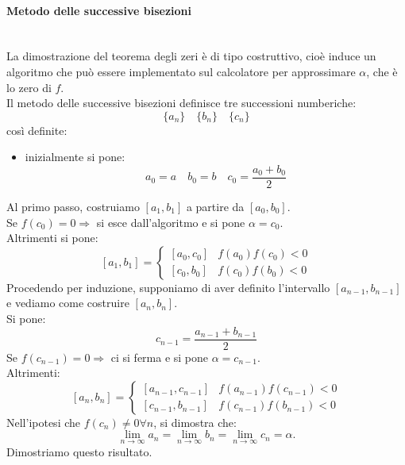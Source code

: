 \documentclass[12pt]{report}
\begin{document}
\paragraph{Metodo delle successive bisezioni} \quad \\
	La dimostrazione del teorema degli zeri è di tipo costruttivo, cioè induce un algoritmo che può essere implementato sul calcolatore per approssimare $\alpha$, che è lo zero di $f$.\\
	Il metodo delle successive bisezioni definisce tre successioni numberiche:
	\[
	\{a_n\} \quad \{b_n\} \quad \{c_n\}
	\]
	così definite:
	\begin{itemize}
		\item inizialmente si pone:
		\[
		a_0 = a \quad b_0 = b \quad c_0 = \frac{a_0 + b_0}{2}
		\]
	\end{itemize}
	Al primo passo, costruiamo $[a_1, b_1]$ a partire da $[a_0, b_0]$. \\
	Se $f(c_0) = 0 \Rightarrow$ si esce dall'algoritmo e si pone $\alpha = c_0$. \\
	Altrimenti si pone:
	\[
	[a_1, b_1] = \begin{cases}
		[a_0, c_0] & f(a_0)f(c_0) < 0 \\
		[c_0, b_0] & f(c_0)f(b_0) < 0
	\end{cases}
	\]
	Procedendo per induzione, supponiamo di aver definito l'intervallo $[a_{n-1}, b_{n-1}]$ e vediamo come costruire $[a_n, b_n]$. \\
	Si pone:
	\[
	c_{n-1} = \frac{a_{n-1} + b_{n-1}}{2}
	\]
	Se $f(c_{n-1}) = 0 \Rightarrow$ ci si ferma e si pone $\alpha = c_{n-1}$. \\
	Altrimenti:
	\[
	[a_n, b_n] = \begin{cases}
		[a_{n-1}, c_{n-1}] & f(a_{n-1})f(c_{n-1}) < 0 \\
		[c_{n-1}, b_{n-1}] & f(c_{n-1})f(b_{n-1}) < 0
	\end{cases}
	\]
	Nell'ipotesi che $f(c_n) \neq 0 \forall n$, si dimostra che:
	\[
	\lim\limits_{n \to \infty} a_n = \lim\limits_{n \to \infty} b_n = \lim\limits_{n \to \infty} c_n = \alpha.
	\]
	Dimostriamo questo risultato.
\end{document}
